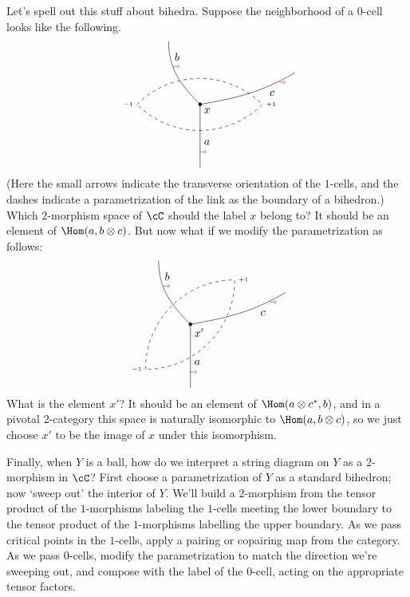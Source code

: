 \documentclass[11pt]{amsart}
\theoremstyle{plain}
\newcommand{\tensor}{\otimes}
\begin{document}
Let's spell out this stuff about bihedra. Suppose the neighborhood of a $0$-cell looks like the following.
$$
\begin{tikzpicture}
\draw[fill] (0,0) circle (0.5mm) node[anchor=north west] (x) {$x$};
\draw (0,0) to[out=135,in=-90] node[above=10] {$b$} (-1,2);
\draw (0,0) to[out=10,in=-150] node[right=15] {$c$} (3,1);
\draw (0,0) -- node[below right] {$a$} (0,-2);
\draw[red,->] (0,-1.5) -- +(0.2,0);
\draw[red,->] (-0.85,1.2) -- +(0.2,0);
\draw[red,->] (2.5,0.7) -- +(0.2,0);
\draw[dashed] (-2,0) arc (135:45:2.81) node[anchor=west] {\tiny $+1$} arc (-45:-135:2.81) node[anchor=east] {\tiny $-1$};
\end{tikzpicture}
$$
(Here the small arrows indicate the transverse orientation of the $1$-cells, and the dashes indicate a parametrization of the link as the boundary of a bihedron.)
Which $2$-morphism space of $\cC$ should the label $x$ belong to? It should be an element of $\Hom(a, b \tensor c)$. But now what if we modify the parametrization as follows:
$$
\begin{tikzpicture}
\draw[fill] (0,0) circle (0.5mm) node[anchor=north west] (x) {$x'$};
\draw (0,0) to[out=135,in=-90] node[above=10] {$b$} (-1,2);
\draw (0,0) to[out=10,in=-150] node[right=15] {$c$} (3,1);
\draw (0,0) -- node[below right] {$a$} (0,-2);
\draw[red,->] (0,-1.5) -- +(0.2,0);
\draw[red,->] (-0.85,1.2) -- +(0.2,0);
\draw[red,->] (2.5,0.7) -- +(0.2,0);
\draw[dashed] (225:2) arc (180:90:2.81) node[anchor=west] {\tiny $+1$} arc (0:-90:2.81) node[anchor=east] {\tiny $-1$};
\end{tikzpicture}
$$
What is the element $x'$? It should be an element of $\Hom(a \tensor c^*, b)$, and in a pivotal $2$-category this space is naturally isomorphic to $\Hom(a, b \tensor c)$, so we just choose $x'$ to be the image of $x$ under this isomorphism.

Finally, when $Y$ is a ball, how do we interpret a string diagram on $Y$ as a $2$-morphism in $\cC$? First choose a parametrization of $Y$ as a standard bihedron; now `sweep out' the interior of $Y$. We'll build a $2$-morphism from the tensor product of the $1$-morphisms labeling the $1$-cells meeting the lower boundary to the tensor product of the $1$-morphisms labelling the upper boundary. As we pass critical points in the $1$-cells, apply a pairing or copairing map from the category. As we pass $0$-cells, modify the parametrization to match the direction we're sweeping out, and compose with the label of the $0$-cell, acting on the appropriate tensor factors.
\end{document}
